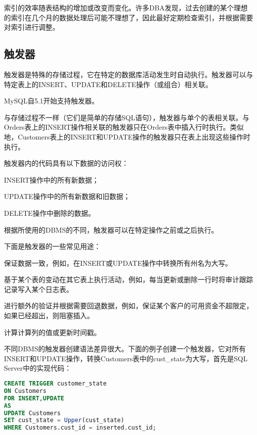 索引的效率随表结构的增加或改变而变化。许多DBA发现，过去创建的某个理想的索引在几个月的数据处理后可能不理想了，因此最好定期检查索引，并根据需要对索引进行调整。







\subsection{触发器}

触发器是特殊的存储过程，它在特定的数据库活动发生时自动执行。触发器可以与特定表上的INSERT、UPDATE和DELETE操作（或组合）相关联。

MySQL自5.1开始支持触发器。

与存储过程不一样（它们是简单的存储SQL语句），触发器与单个的表相关联。与Orders表上的INSERT操作相关联的触发器只在Orders表中插入行时执行。类似地，Customers表上的INSERT和UPDATE操作的触发器只在表上出现这些操作时执行。

触发器内的代码具有以下数据的访问权：

\begin{compactitem}
\item INSERT操作中的所有新数据；
\item UPDATE操作中的所有新数据和旧数据；
\item DELETE操作中删除的数据。
\end{compactitem}

根据所使用的DBMS的不同，触发器可以在特定操作之前或之后执行。

下面是触发器的一些常见用途：

\begin{compactitem}
\item 保证数据一致，例如，在INSERT或UPDATE操作中转换所有州名为大写。
\item 基于某个表的变动在其它表上执行活动，例如，每当更新或删除一行时将审计跟踪记录写入某个日志表。
\item 进行额外的验证并根据需要回退数据，例如，保证某个客户的可用资金不超限定，如果已经超出，则阻塞插入。
\item 计算计算列的值或更新时间戳。
\end{compactitem}

不同DBMS的触发器创建语法差异很大。下面的例子创建一个触发器，它对所有INSERT和UPDATE操作，转换Customers表中的cust\_state为大写，首先是SQL Server中的实现代码：


\begin{lstlisting}[language=SQL]
CREATE TRIGGER customer_state
ON Customers
FOR INSERT,UPDATE
AS
UPDATE Customers
SET cust_state = Upper(cust_state)
WHERE Customers.cust_id = inserted.cust_id;
\end{lstlisting}



